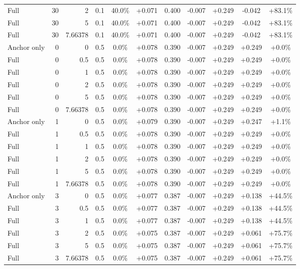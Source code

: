 \begin{table}[htbp]
\begin{tabular}{lrrrccccccc}
Full & 30 & 2 & 0.1 & 40.0\% & +0.071 & 0.400 & -0.007 & +0.249 & -0.042 & +83.1\% \\
Full & 30 & 5 & 0.1 & 40.0\% & +0.071 & 0.400 & -0.007 & +0.249 & -0.042 & +83.1\% \\
Full & 30 & 7.66378 & 0.1 & 40.0\% & +0.071 & 0.400 & -0.007 & +0.249 & -0.042 & +83.1\% \\
Anchor only & 0 & 0 & 0.5 & 0.0\% & +0.078 & 0.390 & -0.007 & +0.249 & +0.249 & +0.0\% \\
Full & 0 & 0.5 & 0.5 & 0.0\% & +0.078 & 0.390 & -0.007 & +0.249 & +0.249 & +0.0\% \\
Full & 0 & 1 & 0.5 & 0.0\% & +0.078 & 0.390 & -0.007 & +0.249 & +0.249 & +0.0\% \\
Full & 0 & 2 & 0.5 & 0.0\% & +0.078 & 0.390 & -0.007 & +0.249 & +0.249 & +0.0\% \\
Full & 0 & 5 & 0.5 & 0.0\% & +0.078 & 0.390 & -0.007 & +0.249 & +0.249 & +0.0\% \\
Full & 0 & 7.66378 & 0.5 & 0.0\% & +0.078 & 0.390 & -0.007 & +0.249 & +0.249 & +0.0\% \\
Anchor only & 1 & 0 & 0.5 & 0.0\% & +0.079 & 0.390 & -0.007 & +0.249 & +0.247 & +1.1\% \\
Full & 1 & 0.5 & 0.5 & 0.0\% & +0.078 & 0.390 & -0.007 & +0.249 & +0.249 & +0.0\% \\
Full & 1 & 1 & 0.5 & 0.0\% & +0.078 & 0.390 & -0.007 & +0.249 & +0.249 & +0.0\% \\
Full & 1 & 2 & 0.5 & 0.0\% & +0.078 & 0.390 & -0.007 & +0.249 & +0.249 & +0.0\% \\
Full & 1 & 5 & 0.5 & 0.0\% & +0.078 & 0.390 & -0.007 & +0.249 & +0.249 & +0.0\% \\
Full & 1 & 7.66378 & 0.5 & 0.0\% & +0.078 & 0.390 & -0.007 & +0.249 & +0.249 & +0.0\% \\
Anchor only & 3 & 0 & 0.5 & 0.0\% & +0.077 & 0.387 & -0.007 & +0.249 & +0.138 & +44.5\% \\
Full & 3 & 0.5 & 0.5 & 0.0\% & +0.077 & 0.387 & -0.007 & +0.249 & +0.138 & +44.5\% \\
Full & 3 & 1 & 0.5 & 0.0\% & +0.077 & 0.387 & -0.007 & +0.249 & +0.138 & +44.5\% \\
Full & 3 & 2 & 0.5 & 0.0\% & +0.075 & 0.387 & -0.007 & +0.249 & +0.061 & +75.7\% \\
Full & 3 & 5 & 0.5 & 0.0\% & +0.075 & 0.387 & -0.007 & +0.249 & +0.061 & +75.7\% \\
Full & 3 & 7.66378 & 0.5 & 0.0\% & +0.075 & 0.387 & -0.007 & +0.249 & +0.061 & +75.7\% \\

\end{tabular}
\end{table}
